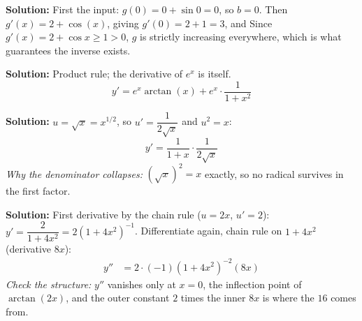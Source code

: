 \documentclass[12pt]{article}
\begin{document}
\textbf{Solution:} First the input: $g(0) = 0 + \sin 0 = 0$, so $b = 0$. Then
$g'(x) = 2 + \cos(x)$, giving $g'(0) = 2 + 1 = 3$, and
Since $g'(x) = 2 + \cos x \geq 1 > 0$, $g$ is strictly increasing everywhere, which is what
guarantees the inverse exists.

\textbf{Solution:} Product rule; the derivative of $e^{x}$ is itself.
\[ y' = e^{x}\arctan(x) + e^{x}\cdot\frac{1}{1 + x^{2}} \]

\textbf{Solution:} $u = \sqrt{x} = x^{1/2}$, so $u' = \dfrac{1}{2\sqrt{x}}$ and
$u^{2} = x$:
\[ y' = \frac{1}{1 + x}\cdot\frac{1}{2\sqrt{x}} \]
\emph{Why the denominator collapses:} $(\sqrt{x})^{2} = x$ exactly, so no radical survives in the
first factor.

\textbf{Solution:} First derivative by the chain rule ($u = 2x$, $u' = 2$):
$y' = \dfrac{2}{1 + 4x^{2}} = 2(1 + 4x^{2})^{-1}$. Differentiate again, chain rule on
$1 + 4x^{2}$ (derivative $8x$):
\begin{align*}
y'' &= 2 \cdot (-1)(1 + 4x^{2})^{-2}(8x)
\end{align*}
\emph{Check the structure:} $y''$ vanishes only at $x = 0$, the inflection point of
$\arctan(2x)$, and the outer constant $2$ times the inner $8x$ is where the $16$ comes from.
\end{document}
